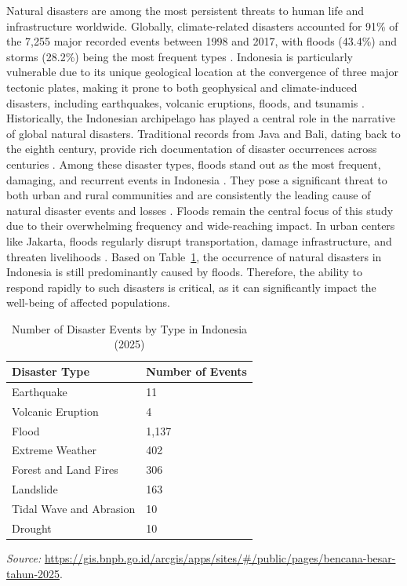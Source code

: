\documentclass[conference,final,a4paper,twoside,10pt]{IEEEtran}
\begin{document}
Natural disasters are among the most persistent threats to human life and infrastructure worldwide. Globally, climate-related disasters accounted for 91\% of the 7,255 major recorded events between 1998 and 2017, with floods (43.4\%) and storms (28.2\%) being the most frequent types \cite{teh2021types}. 
Indonesia is particularly vulnerable due to its unique geological location at the convergence of three major tectonic plates, making it prone to both geophysical and climate-induced disasters, including earthquakes, volcanic eruptions, floods, and tsunamis \cite{hakim2020review}. 
Historically, the Indonesian archipelago has played a central role in the narrative of global natural disasters. Traditional records from Java and Bali, dating back to the eighth century, provide rich documentation of disaster occurrences across centuries \cite{sastrawan2022portents}.
Among these disaster types, floods stand out as the most frequent, damaging, and recurrent events in Indonesia \cite{merten2021rising}. They pose a significant threat to both urban and rural communities and are consistently the leading cause of natural disaster events and losses \cite{jamshed2020conceptual}. Floods remain the central focus of this study due to their overwhelming frequency and wide-reaching impact. In urban centers like Jakarta, floods regularly disrupt transportation, damage infrastructure, and threaten livelihoods \cite{sholihah2020analysis}. 
Based on Table~\ref{tab:disaster2025}, the occurrence of natural disasters in Indonesia is still predominantly caused by floods. Therefore, the ability to respond rapidly to such disasters is critical, as it can significantly impact the well-being of affected populations.
\begin{table}[H]
\caption{Number of Disaster Events by Type in Indonesia (2025)}
\begin{center}
\begin{tabular}{|l|p{2cm}|}
\hline
\textbf{Disaster Type} & \textbf{Number of Events} \\
\hline
Earthquake & 11 \\
\hline
Volcanic Eruption & 4 \\
\hline
Flood & 1,137 \\
\hline
Extreme Weather & 402 \\
\hline
Forest and Land Fires & 306 \\
\hline
Landslide & 163 \\
\hline
Tidal Wave and Abrasion & 10 \\
\hline
Drought & 10 \\
\hline
\end{tabular}
\end{center}
\vspace{0.2cm}
\footnotesize{\textit{Source:} \url{https://gis.bnpb.go.id/arcgis/apps/sites/#/public/pages/bencana-besar-tahun-2025}.}
\label{tab:disaster2025}
\end{table}
\end{document}
